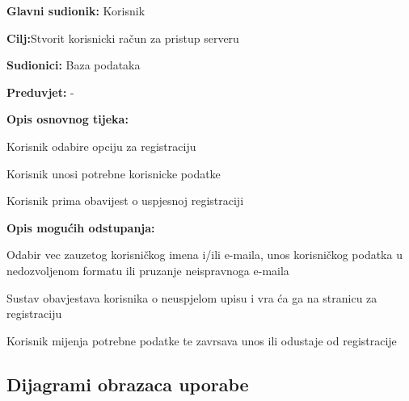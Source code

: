 \noindent {}
\begin{packed_item}
	
	\item \textbf{Glavni sudionik: } Korisnik
	\item  \textbf{Cilj:}Stvorit korisnicki račun za pristup serveru
	\item  \textbf{Sudionici:} Baza podataka
	\item  \textbf{Preduvjet:} -
	\item  \textbf{Opis osnovnog tijeka:}
	
	\item[] \begin{packed_enum}
		
		\item Korisnik odabire opciju za registraciju
		\item Korisnik unosi potrebne korisnicke podatke
		\item Korisnik prima obavijest o uspjesnoj registraciji
		
	\end{packed_enum}
	\newpage
		\item  \textbf{Opis mogućih odstupanja:}
	\item[] \begin{packed_item}
		
		\item[2.a] Odabir vec zauzetog korisničkog imena i/ili e-maila, unos korisničkog podatka u nedozvoljenom formatu ili pruzanje neispravnoga e-maila
		\item[] \begin{packed_enum}
			
			\item {Sustav obavjestava korisnika o neuspjelom upisu i vra ća ga na stranicu za registraciju} 
			
			\item {Korisnik mijenja potrebne podatke te zavrsava unos ili odustaje od registracije}
		\end{packed_enum}
		
	\end{packed_item}
	
\end{packed_item}

\newpage

\subsection{Dijagrami obrazaca uporabe}



